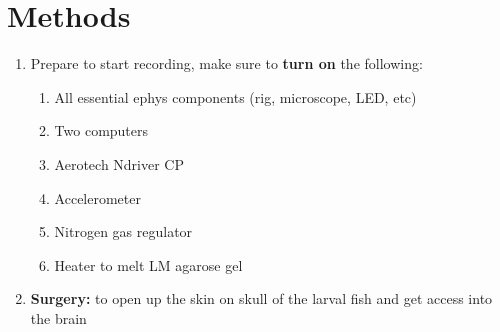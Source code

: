 \documentclass[11pt]{article}
\begin{document}
\section{Methods}
	\begin{enumerate}[label=(\alph*)]
		\item Prepare to start recording, make sure to \textbf{turn on} the following:
		
		\begin{enumerate}[label=\arabic*.]
			\item All essential ephys components (rig, microscope, LED, etc)
			\item Two computers
			\item Aerotech Ndriver CP
			\item Accelerometer
			\item Nitrogen gas regulator
			\item Heater to melt LM agarose gel
		\end{enumerate}
	
		\item \textbf{Surgery:} to open up the skin on skull of the larval fish and get access into the brain
		

\end{enumerate}
\end{document}
